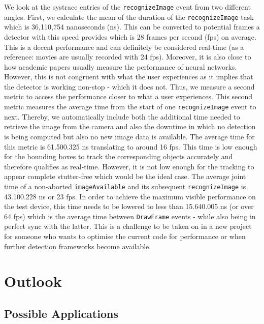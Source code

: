 \documentclass[
			   fontsize=11pt,
               paper=a4,
               bibliography=totoc,
               idxtotoc,
               headsepline,
               footsepline,
               footinclude=false,
               BCOR=12mm,
               DIV=13,
               openany,   %
               oneside    %
               ]
               {scrbook}
\newcommand{\code}[1]{\lstinline[basicstyle = \ttfamily\small]{#1}} %
\begin{document}
We look at the systrace entries of the \code{recognizeImage} event from two different angles. First, we calculate the mean of the duration of the \code{recognizeImage} task which is 36,110,754 nanoseconds (ns). This can be converted to potential frames a detector with this speed provides which is 28 frames per second (fps) on average. This is a decent performance and can definitely be considered real-time (as a reference: movies are usually recorded with 24 fps). Moreover, it is also close to how academic papers usually measure the performance of neural networks. However, this is not congruent with what the user experiences as it implies that the detector is working non-stop - which it does not. Thus, we measure a second metric to access the performance closer to what a user experiences. This second metric measures the average time from the start of one \code{recognizeImage} event to next. Thereby, we automatically include both the additional time needed to retrieve the image from the camera and also the downtime in which no detection is being computed but also no new image data is available. The average time for this metric is 61.500.325 ns translating to around 16 fps. This time is low enough for the bounding boxes to track the corresponding objects accurately and therefore qualifies as real-time. However, it is not low enough for the tracking to appear complete stutter-free which would be the ideal case. The average joint time of a non-aborted \code{imageAvailable} and its subsequent \code{recognizeImage} is 43.100.228 ns or 23 fps. In order to achieve the maximum visible performance on the test device, this time needs to be lowered to less than 15.640.005 ns (or over 64 fps) which is the average time between \code{DrawFrame} events - while also being in perfect sync with the latter. This is a challenge to be taken on in a new project for someone who wants to optimise the current code for performance or when further detection frameworks become available.


\chapter{Outlook}

\section{Possible Applications}
\end{document}
